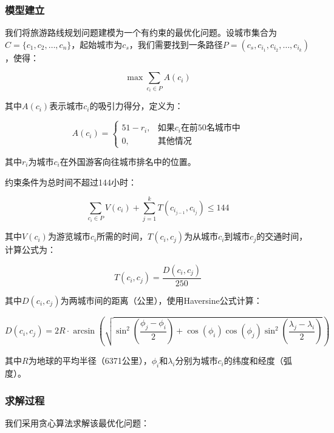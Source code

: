 \documentclass[withoutpreface,bwprint]{cumcmthesis} %
\begin{document}
\subsubsection{模型建立}
我们将旅游路线规划问题建模为一个有约束的最优化问题。设城市集合为$C = \{c_1, c_2, \ldots, c_n\}$，起始城市为$c_s$，我们需要找到一条路径$P = (c_s, c_{i_1}, c_{i_2}, \ldots, c_{i_k})$，使得：

\begin{equation}
\max \sum_{c_i \in P} A(c_i)
\end{equation}

其中$A(c_i)$表示城市$c_i$的吸引力得分，定义为：

\begin{equation}
A(c_i) = \begin{cases}
51 - r_i, & \text{如果$c_i$在前50名城市中} \\
0, & \text{其他情况}
\end{cases}
\end{equation}

其中$r_i$为城市$c_i$在外国游客向往城市排名中的位置。

约束条件为总时间不超过144小时：

\begin{equation}
\sum_{c_i \in P} V(c_i) + \sum_{j=1}^{k} T(c_{i_{j-1}}, c_{i_j}) \leq 144
\end{equation}

其中$V(c_i)$为游览城市$c_i$所需的时间，$T(c_i, c_j)$为从城市$c_i$到城市$c_j$的交通时间，计算公式为：

\begin{equation}
T(c_i, c_j) = \frac{D(c_i, c_j)}{250}
\end{equation}

其中$D(c_i, c_j)$为两城市间的距离（公里），使用Haversine公式计算：

\begin{equation}
D(c_i, c_j) = 2R \cdot \arcsin\left(\sqrt{\sin^2\left(\frac{\phi_j - \phi_i}{2}\right) + \cos(\phi_i)\cos(\phi_j)\sin^2\left(\frac{\lambda_j - \lambda_i}{2}\right)}\right)
\end{equation}

其中$R$为地球的平均半径（6371公里），$\phi_i$和$\lambda_i$分别为城市$c_i$的纬度和经度（弧度）。

\subsubsection{求解过程}
我们采用贪心算法求解该最优化问题\cite{xiang2022}：
\end{document}
